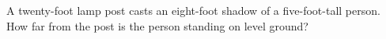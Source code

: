 A twenty-foot lamp post casts an eight-foot shadow of a five-foot-tall person. How far from the post is the person standing on level ground?
